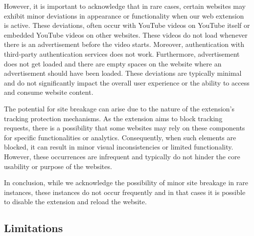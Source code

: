 However, it is important to acknowledge that in rare cases, certain websites may exhibit minor deviations in appearance or
functionality when our web extension is active. These deviations, often occur with YouTube videos on YouTube itself or embedded 
YouTube videos on other websites. These videos do not load whenever there is an advertisement before the video starts. Moreover, 
authentication with third-party authentication services does not work. Furthermore, advertisement does not get loaded and there are empty 
spaces on the website where an advertisement should have been loaded. These deviations are typically minimal and do not significantly impact
the overall user experience or the ability to access and consume website content.

The potential for site breakage can arise due to the nature of the extension's tracking protection mechanisms. As the extension
aims to block tracking requests, there is a possibility that some websites may rely
on these components for specific functionalities or analytics. Consequently, when such elements are blocked, it can result in
minor visual inconsistencies or limited functionality. However, these occurrences are infrequent and typically do not hinder
the core usability or purpose of the websites.

In conclusion, while we acknowledge the possibility of minor site breakage in rare instances, these instances do not occur frequently 
and in that cases it is possible to disable the extension and reload the website.
\subsection{Limitations}

